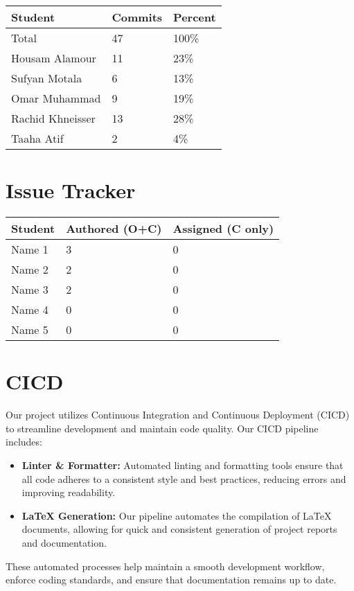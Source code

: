 \documentclass{article}
\begin{document}
\begin{table}[H]
\centering
\begin{tabular}{lll}
\toprule
\textbf{Student} & \textbf{Commits} & \textbf{Percent}\\
\midrule
Total & 47 & 100\% \\
Housam Alamour & 11 & 23\% \\
Sufyan Motala & 6 & 13\% \\
Omar Muhammad & 9 & 19\% \\
Rachid Khneisser & 13 & 28\% \\
Taaha Atif & 2 & 4\% \\
\bottomrule
\end{tabular}
\end{table}

\section{Issue Tracker}

\begin{table}[H]
\centering
\begin{tabular}{lll}
\toprule
\textbf{Student} & \textbf{Authored (O+C)} & \textbf{Assigned (C only)}\\
\midrule
Name 1 & 3 & 0 \\
Name 2 & 2 & 0 \\
Name 3 & 2 & 0 \\
Name 4 & 0 & 0 \\
Name 5 & 0 & 0 \\
\bottomrule
\end{tabular}
\end{table}

\section{CICD}

Our project utilizes Continuous Integration and Continuous Deployment (CICD) to streamline development and maintain code quality. Our CICD pipeline includes:

\begin{itemize}
    \item \textbf{Linter \& Formatter:} Automated linting and formatting tools ensure that all code adheres to a consistent style and best practices, reducing errors and improving readability.
    \item \textbf{LaTeX Generation:} Our pipeline automates the compilation of LaTeX documents, allowing for quick and consistent generation of project reports and documentation.
\end{itemize}

These automated processes help maintain a smooth development workflow, enforce coding standards, and ensure that documentation remains up to date.
\end{document}
